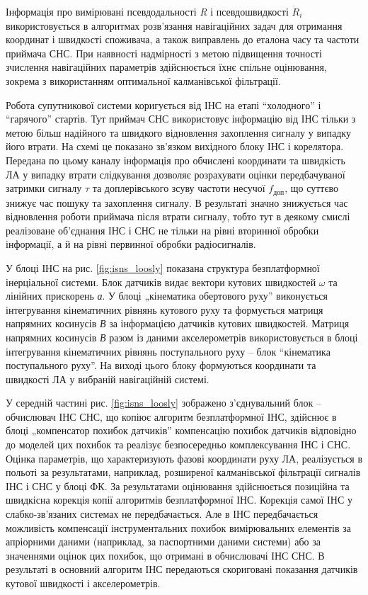 Інформація про вимірювані псевдодальності \textit{R} і псевдошвидкості $\dot{R}_{i} $ використовується 
в алгоритмах розв'язання навігаційних задач для отримання координат і швидкості споживача, 
а також виправлень до еталона часу та частоти приймача СНС. При наявності надмірності 
з метою підвищення точності зчислення навігаційних параметрів здійснюється їхнє спільне 
оцінювання, зокрема з використанням оптимальної калманівської  фільтрації. 

Робота супутникової системи коригується від ІНС на етапі ``холодного'' і ``гарячого'' 
стартів. Тут приймач СНС використовує інформацію від ІНС тільки з метою 
більш надійного та швидкого відновлення захоплення сигналу у випадку його втрати. 
На схемі це показано зв'язком вихідного блоку ІНС і корелятора. Передана по цьому 
каналу інформація про обчислені координати та швидкість ЛА у випадку втрати слідкування 
дозволяє розрахувати оцінки передбачуваної затримки сигналу $\tau$ та доплерівського 
зсуву частоти несучої $f_{\text{доп}}$, що суттєво знижує час пошуку та захоплення сигналу. 
В результаті значно знижується час 
відновлення роботи приймача після втрати сигналу, тобто тут в деякому смислі реалізоване 
об'єднання ІНС і СНС не тільки на рівні вторинної обробки інформації, а й на рівні 
первинної обробки радіосигналів. 

У блоці ІНС на рис. \ref{fig:isns_loosly} показана структура безплатформної інерціальної системи. 
Блок датчиків видає вектори кутових  швидкостей $\omega$ та лінійних прискорень \textit{а}. 
У блоці „кінематика обертового руху'' виконується інтегрування кінематичних рівнянь 
кутового руху та формується матриця напрямних косинусів \textit{В} за інформацією 
датчиків кутових швидкостей. Матриця напрямних косинусів \textit{В} разом із даними 
акселерометрів використовується в блоці інтегрування кінематичних рівнянь поступального 
руху -- блок ``кінематика поступального руху''. На виході цього блоку формуються 
координати та швидкості ЛА у вибраній навігаційній системі.

У середній частині рис. \ref{fig:isns_loosly} зображено з'єднувальний блок -- обчислювач ІНС СНС, 
що копіює алгоритм безплатформної ІНС, здійснює в блоці „компенсатор похибок датчиків'' 
компенсацію похибок датчиків відповідно до моделей цих похибок та реалізує безпосередньо 
комплексування ІНС і СНС. Оцінка параметрів, що характеризують фазові координати 
руху ЛА, реалізується в польоті за результатами, наприклад, розширеної калманівської 
фільтрації сигналів ІНС і СНС у блоці ФК. За результатами оцінювання здійснюється 
позиційна та швидкісна корекція копії алгоритмів безплатформної ІНС. Корекція самої 
ІНС у слабко-зв'язаних системах не передбачається. Але в ІНС передбачається можливість 
компенсації інструментальних похибок вимірювальних елементів за апріорними даними 
(наприклад, за паспортними даними  системи) або за значеннями оцінок цих похибок, 
що отримані в обчислювачі ІНС СНС. В результаті в основний алгоритм ІНС передаються 
скориговані показання датчиків кутової швидкості і акселерометрів.

